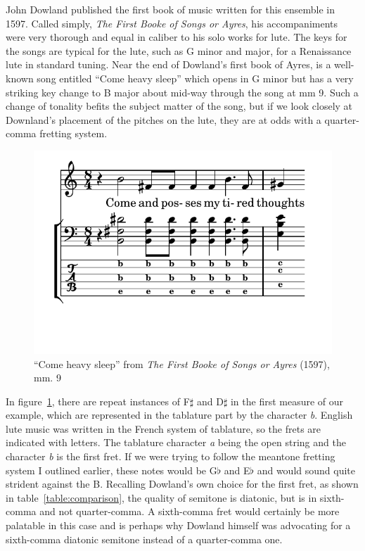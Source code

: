 John Dowland published the first book of music written for this ensemble in 1597.
Called simply, \textit{The First Booke of Songs or Ayres}, his accompaniments were very
thorough and equal in caliber to his solo works for lute.  The keys for the songs are
typical for the lute, such as G minor and major, for a Renaissance lute in standard
tuning. Near the end of Dowland's first book of Ayres, is a well-known song entitled
``Come heavy sleep'' which opens in G minor but has a very striking key change to B
major about mid-way through the song at mm 9. Such a change of tonality befits the
subject matter of the song, but if we look closely at Downland's placement of the
pitches on the lute, they are at odds with a quarter-comma fretting system.
\begin{figure}[h]
\centering
\includegraphics{examples/come.pdf}
\caption{``Come heavy sleep'' from \textit{The First Booke of Songs or Ayres} (1597), mm. 9}
\label{dowland-come}
\end{figure}
In figure~\ref{dowland-come}, there are repeat instances of F$\sharp$ and D$\sharp$ in the
first measure of our example, which are represented in the tablature part by the character
\textit{b}.  English lute music was written in the French system of tablature, so the
frets are indicated with letters.  The tablature character \textit{a} being the open
string and the character \textit{b} is the first fret.  If we were trying to follow the
meantone fretting system I outlined earlier, these notes would be G$\flat$ and E$\flat$
and would sound quite strident against the B.  Recalling Dowland's own choice for the
first fret, as shown in table~\ref{table:comparison}, the quality of semitone is diatonic,
but is in sixth-comma and not quarter-comma.  A sixth-comma fret would certainly be more
palatable in this case and is perhaps why Dowland himself was advocating for a sixth-comma
diatonic semitone instead of a quarter-comma one.

